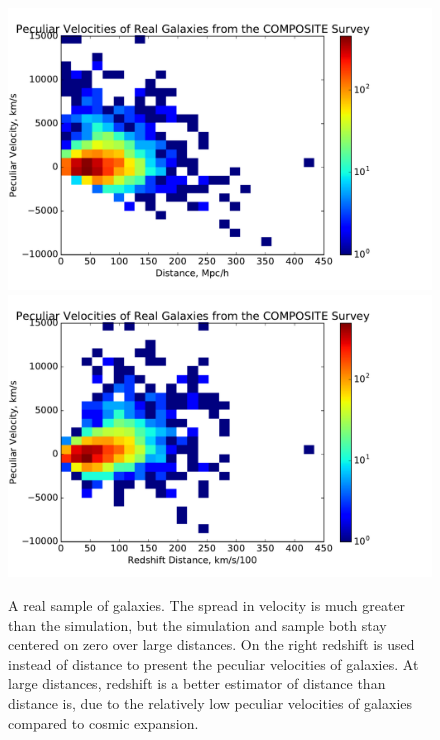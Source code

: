 \documentclass[usenatbib]{mn2e}
\begin{document}
\begin{figure}
\centering

  \includegraphics[scale=0.35]{composite}
\hfill
  \includegraphics[scale=0.35]{compositered}
\caption{\small A real sample of galaxies. The spread in velocity is much greater than the simulation, but the simulation and sample both stay centered on zero over large distances. On the right redshift is used instead of distance to present the peculiar velocities of galaxies. At large distances, redshift is a better estimator of distance than distance is, due to the relatively low peculiar velocities of galaxies compared to cosmic expansion.}
\label{fig:composite}
\end{figure}
\end{document}
